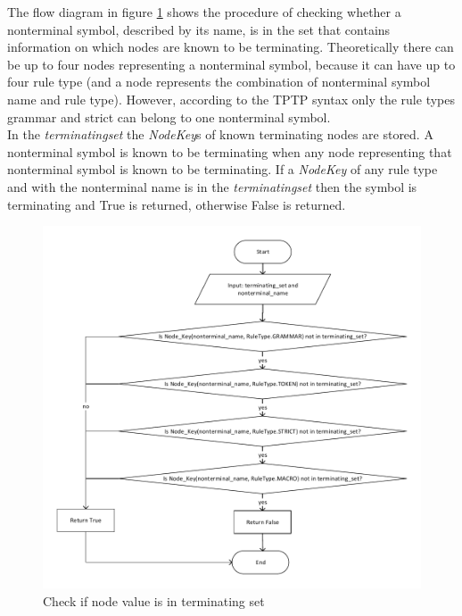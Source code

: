 The flow diagram in figure \ref{fig:ImplementationCheckIfValueInTerminating} shows the procedure of checking whether a nonterminal symbol, described by its name, is in the set that contains information on which nodes are known to be terminating.
Theoretically there can be up to four nodes representing a nonterminal symbol, because it can have up to four rule type (and a node represents the combination of nonterminal symbol name and rule type). However, according to the \ac{TPTP} syntax only the rule types grammar and strict can belong to one nonterminal symbol.\\
In the \textit{terminating\textunderscore set} the \textit{NodeKey}s of known terminating nodes are stored.
A nonterminal symbol is known to be terminating when any node representing that nonterminal symbol is known to be terminating.
If a \textit{NodeKey} of any rule type and  with the nonterminal name is in the \textit{terminating\textunderscore set} then the symbol is terminating and True is returned, otherwise False is returned.
\begin{figure}[H]
\centering
\includegraphics[width=1\textwidth]{images/Implementation_value_in_terminating.pdf}
\caption{Check if node value is in terminating set}
\label{fig:ImplementationCheckIfValueInTerminating}
\end{figure}

